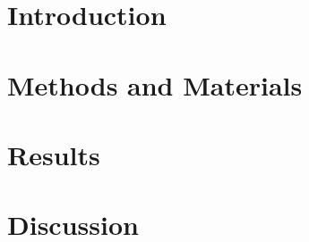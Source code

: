 \documentclass[10pt, openright,oneside]{book}
\begin{document}
 

\chapter{Introduction}


\chapter{Methods and Materials}


\chapter{Results}


\chapter{Discussion}




%


\backmatter

\printbibliography
\end{document}
